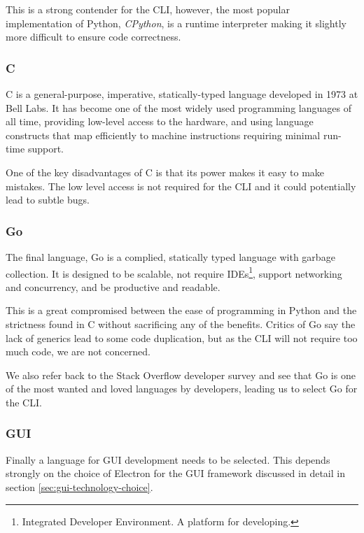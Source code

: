 \documentclass[11pt, a4paper, twoside]{report}
\begin{document}
This is a strong contender for the CLI, however, the most popular implementation of Python, \emph{CPython}, is a runtime interpreter making it slightly more difficult to ensure code correctness.

\subsubsection{C}

C is a general-purpose, imperative, statically-typed language developed in 1973 at Bell Labs. \citep{banahan1988c} It has become one of the most widely used programming languages of all time, providing low-level access to the hardware, and using language constructs that map efficiently to machine instructions requiring minimal run-time support.

One of the key disadvantages of C is that its power makes it easy to make mistakes. The low level access is not required for the CLI and it could potentially lead to subtle bugs.

\subsubsection{Go}

The final language, Go is a complied, statically typed language with garbage collection. It is designed to be scalable, not require IDEs\footnote{Integrated Developer Environment. A platform for developing.}, support networking and concurrency, and be productive and readable. \citep{golang2017faq}

This is a great compromised between the ease of programming in Python and the strictness found in C without sacrificing any of the benefits. Critics of Go say the lack of generics lead to some code duplication, but as the CLI will not require too much code, we are not concerned.

We also refer back to the Stack Overflow developer survey and see that Go is one of the most wanted and loved languages by developers, leading us to select Go for the CLI.

\subsubsection{GUI}

Finally a language for GUI development needs to be selected. This depends strongly on the choice of Electron for the GUI framework discussed in detail in section \ref{sec:gui-technology-choice}.
\end{document}
